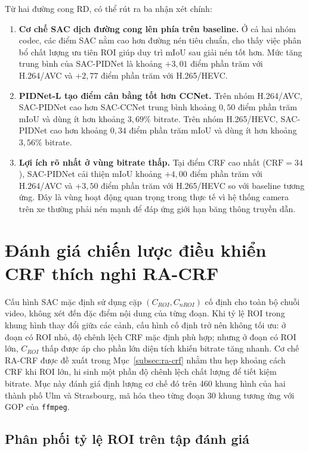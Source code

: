 Từ hai đường cong RD, có thể rút ra ba nhận xét chính:
\begin{enumerate}
  \item \textbf{Cơ chế SAC dịch đường cong lên phía trên baseline.} Ở cả hai nhóm codec, các điểm SAC nằm cao hơn đường nén tiêu chuẩn, cho thấy việc phân bổ chất lượng ưu tiên ROI giúp duy trì mIoU sau giải nén tốt hơn. Mức tăng trung bình của SAC-PIDNet là khoảng $+3{,}01$ điểm phần trăm với H.264/AVC và $+2{,}77$ điểm phần trăm với H.265/HEVC.
  \item \textbf{PIDNet-L tạo điểm cân bằng tốt hơn CCNet.} Trên nhóm H.264/AVC, SAC-PIDNet cao hơn SAC-CCNet trung bình khoảng $0{,}50$ điểm phần trăm mIoU và dùng ít hơn khoảng $3{,}69\%$ bitrate. Trên nhóm H.265/HEVC, SAC-PIDNet cao hơn khoảng $0{,}34$ điểm phần trăm mIoU và dùng ít hơn khoảng $3{,}56\%$ bitrate.
  \item \textbf{Lợi ích rõ nhất ở vùng bitrate thấp.} Tại điểm CRF cao nhất ($\text{CRF}=34$), SAC-PIDNet cải thiện mIoU khoảng $+4{,}00$ điểm phần trăm với H.264/AVC và $+3{,}50$ điểm phần trăm với H.265/HEVC so với baseline tương ứng. Đây là vùng hoạt động quan trọng trong thực tế vì hệ thống camera trên xe thường phải nén mạnh để đáp ứng giới hạn băng thông truyền dẫn.
\end{enumerate}

\section{Đánh giá chiến lược điều khiển CRF thích nghi RA-CRF}
\label{sec:racrf-eval}

Cấu hình SAC mặc định sử dụng cặp $(C_{ROI}, C_{nROI})$ cố định cho toàn bộ chuỗi video, không xét đến đặc điểm nội dung của từng đoạn. Khi tỷ lệ ROI trong khung hình thay đổi giữa các cảnh, cấu hình cố định trở nên không tối ưu: ở đoạn có ROI nhỏ, độ chênh lệch CRF mặc định phù hợp; nhưng ở đoạn có ROI lớn, $C_{ROI}$ thấp được áp cho phần lớn diện tích khiến bitrate tăng nhanh. Cơ chế RA-CRF được đề xuất trong Mục~\ref{subsec:ra-crf} nhằm thu hẹp khoảng cách CRF khi ROI lớn, hi sinh một phần độ chênh lệch chất lượng để tiết kiệm bitrate. Mục này đánh giá định lượng cơ chế đó trên 460 khung hình của hai thành phố Ulm và Strasbourg, mã hóa theo từng đoạn 30 khung tương ứng với GOP của \texttt{ffmpeg}.

\subsection{Phân phối tỷ lệ ROI trên tập đánh giá}

